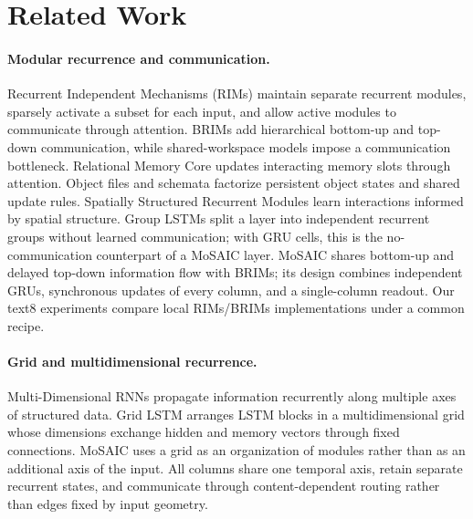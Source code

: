 \documentclass[letterpaper,twoside]{article}
\begin{document}
\section{Related Work}

\paragraph{Modular recurrence and communication.}
Recurrent Independent Mechanisms (RIMs) \citep{goyal2019rims} maintain separate recurrent modules, sparsely activate a subset for each input, and allow active modules to communicate through attention. BRIMs \citep{mittal2020brims} add hierarchical bottom-up and top-down communication, while shared-workspace models \citep{goyal2021workspace} impose a communication bottleneck. Relational Memory Core \citep{santoro2018relational} updates interacting memory slots through attention. Object files and schemata \citep{goyal2021factorizing} factorize persistent object states and shared update rules. Spatially Structured Recurrent Modules \citep{rahaman2021spatial} learn interactions informed by spatial structure. Group LSTMs \citep{kuchaiev2017factorization} split a layer into independent recurrent groups without learned communication; with GRU cells, this is the no-communication counterpart of a MoSAIC layer. MoSAIC shares bottom-up and delayed top-down information flow with BRIMs; its design combines independent GRUs, synchronous updates of every column, and a single-column readout. Our text8 experiments compare local RIMs/BRIMs implementations under a common recipe.

\paragraph{Grid and multidimensional recurrence.}
Multi-Dimensional RNNs \citep{graves2007mdrnn} propagate information recurrently along multiple axes of structured data. Grid LSTM \citep{kalchbrenner2015gridlstm} arranges LSTM blocks in a multidimensional grid whose dimensions exchange hidden and memory vectors through fixed connections. MoSAIC uses a grid as an organization of modules rather than as an additional axis of the input. All columns share one temporal axis, retain separate recurrent states, and communicate through content-dependent routing rather than edges fixed by input geometry.
\end{document}
